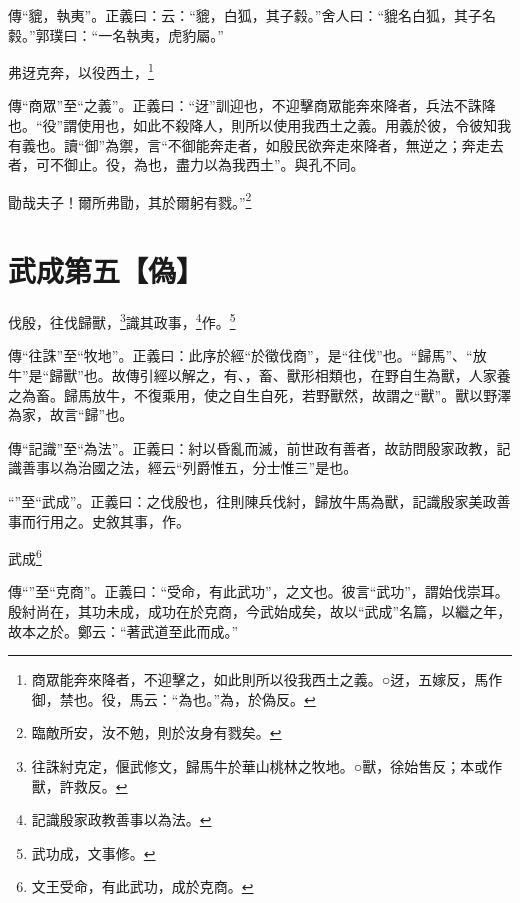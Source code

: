 {\noindent\zhuan{}\fzbyks 傳“貔，執夷”。正義曰：云：“貔，白狐，其子豰。”舍人曰：“貔名白狐，其子名豰。”郭璞曰：“一名執夷，虎豹屬。” \par}

弗迓克奔，以役西土，\footnote{商眾能奔來降者，不迎擊之，如此則所以役我西土之義。○迓，五嫁反，馬作御，禁也。役，馬云：“為也。”為，於偽反。}

{\noindent\zhuan{}\fzbyks 傳“商眾”至“之義”。正義曰：“迓”訓迎也，不迎擊商眾能奔來降者，兵法不誅降也。“役”謂使用也，如此不殺降人，則所以使用我西土之義。用義於彼，令彼知我有義也。讀“御”為禦，言“不御能奔走者，如殷民欲奔走來降者，無逆之；奔走去者，可不御止。役，為也，盡力以為我西土”。與孔不同。 \par}

勖哉夫子！爾所弗勖，其於爾躬有戮。”\footnote{臨敵所安，汝不勉，則於汝身有戮矣。}

\section{武成第五【偽】}


伐殷，往伐歸獸，\footnote{往誅紂克定，偃武修文，歸馬牛於華山桃林之牧地。○獸，徐始售反；本或作獸，許救反。}識其政事，\footnote{記識殷家政教善事以為法。}作。\footnote{武功成，文事修。}


{\noindent\zhuan{}\fzbyks 傳“往誅”至“牧地”。正義曰：此序於經“於徵伐商”，是“往伐”也。“歸馬”、“放牛”是“歸獸”也。故傳引經以解之，有、，畜、獸形相類也，在野自生為獸，人家養之為畜。歸馬放牛，不復乘用，使之自生自死，若野獸然，故謂之“獸”。獸以野澤為家，故言“歸”也。 \par}

{\noindent\zhuan{}\fzbyks 傳“記識”至“為法”。正義曰：紂以昏亂而滅，前世政有善者，故訪問殷家政教，記識善事以為治國之法，經云“列爵惟五，分士惟三”是也。 \par}

{\noindent\shu{}\fzkt “”至“武成”。正義曰：之伐殷也，往則陳兵伐紂，歸放牛馬為獸，記識殷家美政善事而行用之。史敘其事，作。 \par}

武成\footnote{文王受命，有此武功，成於克商。}

{\noindent\zhuan{}\fzbyks 傳“”至“克商”。正義曰：“受命，有此武功”，之文也。彼言“武功”，謂始伐崇耳。殷紂尚在，其功未成，成功在於克商，今武始成矣，故以“武成”名篇，以繼之年，故本之於。鄭云：“著武道至此而成。” \par}

